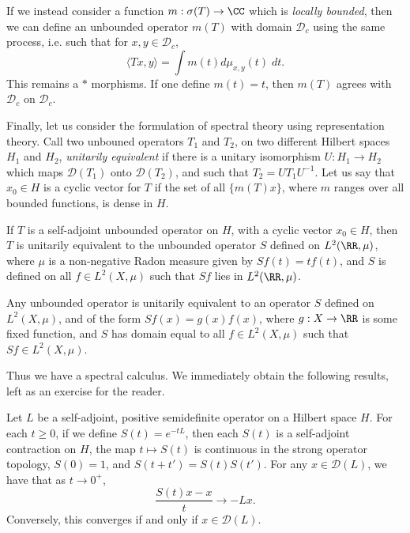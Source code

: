 If we instead consider a function $m: \sigma(T) \to \CC$ which is \emph{locally bounded}, then we can define an unbounded operator $m(T)$ with domain $\mathcal{D}_c$ using the same process, i.e. such that for $x,y \in \mathcal{D}_c$,
%
\[ \langle Tx, y \rangle = \int m(t) d\mu_{x,y}(t)\; dt. \]
%
This remains a $*$ morphisms. If one define $m(t) = t$, then $m(T)$ agrees with $\mathcal{D}_c$ on $\mathcal{D}_c$.

Finally, let us consider the formulation of spectral theory using representation theory. Call two unbouned operators $T_1$ and $T_2$, on two different Hilbert spaces $H_1$ and $H_2$, \emph{unitarily equivalent} if there is a unitary isomorphism $U: H_1 \to H_2$ which maps $\mathcal{D}(T_1)$ onto $\mathcal{D}(T_2)$, and such that $T_2 = UT_1U^{-1}$. Let us say that $x_0 \in H$ is a cyclic vector for $T$ if the set of all $\{ m(T) x \}$, where $m$ ranges over all bounded functions, is dense in $H$.

\begin{theorem}
    If $T$ is a self-adjoint unbounded operator on $H$, with a cyclic vector $x_0 \in H$, then $T$ is unitarily equivalent to the unbounded operator $S$ defined on $L^2(\RR,\mu)$, where $\mu$ is a non-negative Radon measure given by $Sf(t) = tf(t)$, and $S$ is defined on all $f \in L^2(X,\mu)$ such that $Sf$ lies in $L^2(\RR,\mu)$.
\end{theorem}

\begin{theorem}
    Any unbounded operator is unitarily equivalent to an operator $S$ defined on $L^2(X,\mu)$, and of the form $Sf(x) = g(x) f(x)$, where $g: X \to \RR$ is some fixed function, and $S$ has domain equal to all $f \in L^2(X,\mu)$ such that $Sf \in L^2(X,\mu)$.
\end{theorem}

Thus we have a spectral calculus. We immediately obtain the following results, left as an exercise for the reader.

\begin{theorem}
    Let $L$ be a self-adjoint, positive semidefinite operator on a Hilbert space $H$. For each $t \geq 0$, if we define $S(t) = e^{-tL}$, then each $S(t)$ is a self-adjoint contraction on $H$, the map $t \mapsto S(t)$ is continuous in the strong operator topology, $S(0) = 1$, and $S(t + t') = S(t) S(t')$. For any $x \in \mathcal{D}(L)$, we have that as $t \to 0^+$,
    \[ \frac{S(t) x - x}{t} \to - Lx. \]
    Conversely, this converges if and only if $x \in \mathcal{D}(L)$.
\end{theorem}

